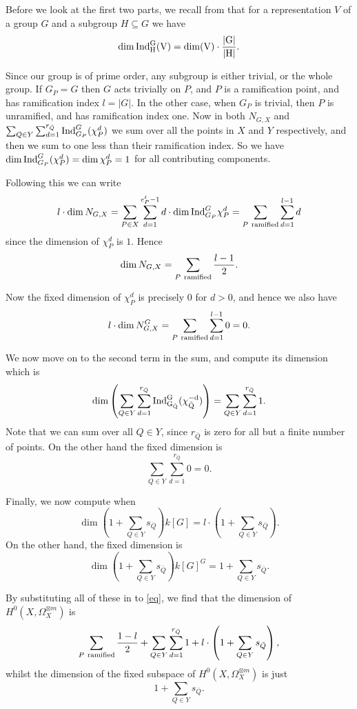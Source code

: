 \documentclass[11pt]{article} %
\theoremstyle{remark}\newtheorem*{rem}{Remark}
\begin{document}
Before we look at the first two parts, we recall from \citep[Rem. 4.30]{introtoreps} that for a representation $V$ of a group $G$ and a subgroup $H\subseteq G$ we have
\[
  \dim \rm{Ind}_H^G(V) = \dim(V)\cdot\frac{|G|}{|H|}.
\]

Since our group is of prime order, any subgroup is either trivial, or the whole group.
If $G_P = G$ then $G$ acts trivially on $P$, and $P$ is a ramification point, and has ramification index $l=|G|$.
In the other case, when $G_P$ is trivial, then $P$ is unramified, and has ramification index one.
Now in both $N_{G,X}$ and $\sum_{Q\in Y}\sum^{r_{\bar Q}}_{d=1} {\rm Ind}_{G_P}^G(\chi_P^d)$ we sum over all the points in $X$ and $Y$ respectively, and then we sum to one less than their ramification index.
So we have $\dim {\rm Ind}_{G_P}^G(\chi_P^d) = \dim \chi_P^d = 1$ for all contributing components.

Following this we can write 
\[
 l\cdot \dim N_{G,X} = \sum_{P\in X} \sum_{d=1}^{e^t_P -1} d\cdot \dim {\rm Ind}_{G_P}^G\chi_P^d = \sum_{P\ \rm{ ramified}} \sum_{d=1}^{l -1} d
\]
since the dimension of $\chi^d_P$ is $1$.
Hence
\[
 \dim N_{G,X} = \sum_{P\ \rm{ ramified}}  \frac{l-1}{2}.
\]

Now the fixed dimension of $\chi^d_P$ is precisely 0 for $d>0$, and hence we also have
\[
 l\cdot \dim N_{G,X}^G = \sum_{P\ \rm{ ramified}} \sum_{d=1}^{l-1} 0 = 0.
\]

We now move on to the second term in the sum, and compute its dimension which is
\[
 \dim \left(\sum_{Q\in Y} \sum_{d=1}^{r_{\bar Q}} \rm{Ind}_{G_{\bar Q}}^G (\chi_{\bar Q}^{-d})\right) = \sum_{Q\in Y} \sum_{d=1}^{r_{\bar Q}} 1.
\]
Note that we can sum over all $Q\in Y$, since $r_{\bar Q}$ is zero for all but a finite number of points.
On the other hand the fixed dimension is
\[
 \sum_{Q\in Y} \sum_{d=1}^{r_{\bar Q}} 0 = 0.
\]


Finally, we now compute when 
\[
 \dim \left( 1 + \sum_{Q\in Y} s_{\bar Q} \right) k[G] = l\cdot \left( 1 + \sum_{Q\in Y} s_{\bar Q} \right).
 \]
On the other hand, the fixed dimension is
\[
\dim \left( 1 + \sum_{Q\in Y} s_{\bar Q} \right) k[G]^G = 1 + \sum_{Q\in Y} s_{\bar Q}.
\]

By substituting all of these in to \ref{eq}, we find that the dimension of $H^0(X,\Omega_X^{\otimes m})$ is
\[
 \sum_{P\ {\rm ramified}} \frac{1-l}{2} + \sum_{Q\in Y}\sum_{d=1}^{r_{\bar Q}} 1 + l\cdot \left( 1 + \sum_{Q\in Y} s_{\bar Q} \right),
\]
whilst the dimension of the fixed subspace of $H^0(X,\Omega_X^{\otimes m})$ is just
\[
 1 + \sum_{Q\in Y} s_{\bar Q}.
\]
\end{document}
